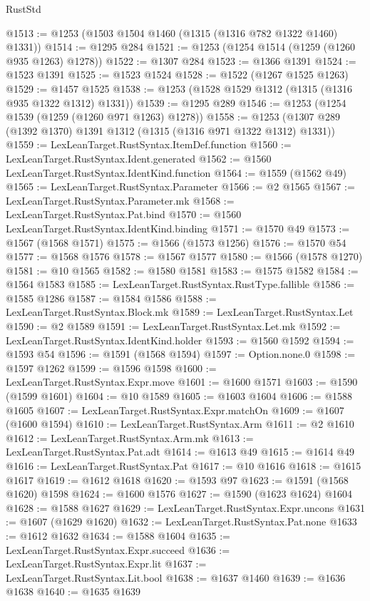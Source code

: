 \begin{lexlean}{RustStd}
\begin{coremodule}
@1513 := @1253 (@1503 @1504 @1460 (@1315 (@1316 @782 @1322 @1460) @1331))
@1514 := @1295 @284
@1521 := @1253 (@1254 @1514 (@1259 (@1260 @935 @1263) @1278))
@1522 := @1307 @284
@1523 := @1366 @1391
@1524 := @1523 @1391
@1525 := @1523 @1524
@1528 := @1522 (@1267 @1525 @1263)
@1529 := @1457 @1525
@1538 := @1253 (@1528 @1529 @1312 (@1315 (@1316 @935 @1322 @1312) @1331))
@1539 := @1295 @289
@1546 := @1253 (@1254 @1539 (@1259 (@1260 @971 @1263) @1278))
@1558 := @1253 (@1307 @289 (@1392 @1370) @1391 @1312 (@1315 (@1316 @971 @1322 @1312) @1331))
@1559 := LexLeanTarget.RustSyntax.ItemDef.function
@1560 := LexLeanTarget.RustSyntax.Ident.generated
@1562 := @1560 LexLeanTarget.RustSyntax.IdentKind.function
@1564 := @1559 (@1562 @49)
@1565 := LexLeanTarget.RustSyntax.Parameter
@1566 := @2 @1565
@1567 := LexLeanTarget.RustSyntax.Parameter.mk
@1568 := LexLeanTarget.RustSyntax.Pat.bind
@1570 := @1560 LexLeanTarget.RustSyntax.IdentKind.binding
@1571 := @1570 @49
@1573 := @1567 (@1568 @1571)
@1575 := @1566 (@1573 @1256)
@1576 := @1570 @54
@1577 := @1568 @1576
@1578 := @1567 @1577
@1580 := @1566 (@1578 @1270)
@1581 := @10 @1565
@1582 := @1580 @1581
@1583 := @1575 @1582
@1584 := @1564 @1583
@1585 := LexLeanTarget.RustSyntax.RustType.fallible
@1586 := @1585 @1286
@1587 := @1584 @1586
@1588 := LexLeanTarget.RustSyntax.Block.mk
@1589 := LexLeanTarget.RustSyntax.Let
@1590 := @2 @1589
@1591 := LexLeanTarget.RustSyntax.Let.mk
@1592 := LexLeanTarget.RustSyntax.IdentKind.holder
@1593 := @1560 @1592
@1594 := @1593 @54
@1596 := @1591 (@1568 @1594)
@1597 := Option.none.{0}
@1598 := @1597 @1262
@1599 := @1596 @1598
@1600 := LexLeanTarget.RustSyntax.Expr.move
@1601 := @1600 @1571
@1603 := @1590 (@1599 @1601)
@1604 := @10 @1589
@1605 := @1603 @1604
@1606 := @1588 @1605
@1607 := LexLeanTarget.RustSyntax.Expr.matchOn
@1609 := @1607 (@1600 @1594)
@1610 := LexLeanTarget.RustSyntax.Arm
@1611 := @2 @1610
@1612 := LexLeanTarget.RustSyntax.Arm.mk
@1613 := LexLeanTarget.RustSyntax.Pat.adt
@1614 := @1613 @49
@1615 := @1614 @49
@1616 := LexLeanTarget.RustSyntax.Pat
@1617 := @10 @1616
@1618 := @1615 @1617
@1619 := @1612 @1618
@1620 := @1593 @97
@1623 := @1591 (@1568 @1620) @1598
@1624 := @1600 @1576
@1627 := @1590 (@1623 @1624) @1604
@1628 := @1588 @1627
@1629 := LexLeanTarget.RustSyntax.Expr.uncons
@1631 := @1607 (@1629 @1620)
@1632 := LexLeanTarget.RustSyntax.Pat.none
@1633 := @1612 @1632
@1634 := @1588 @1604
@1635 := LexLeanTarget.RustSyntax.Expr.succeed
@1636 := LexLeanTarget.RustSyntax.Expr.lit
@1637 := LexLeanTarget.RustSyntax.Lit.bool
@1638 := @1637 @1460
@1639 := @1636 @1638
@1640 := @1635 @1639

\end{coremodule}
\end{lexlean}
